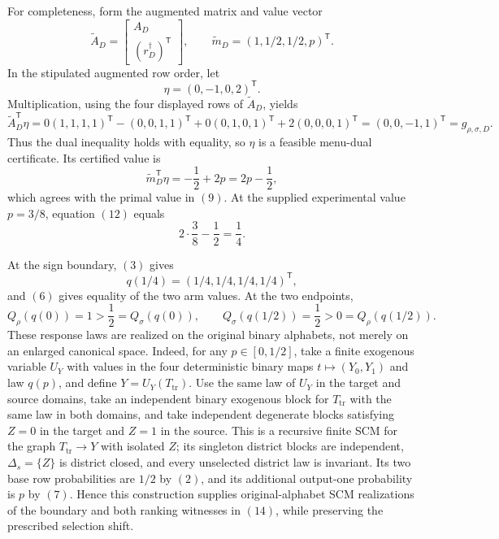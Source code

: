 For completeness, form the augmented matrix and value vector
\[
\widetilde A_D=
\begin{bmatrix}A_D\\(r_D^\dagger)^{\mathsf T}\end{bmatrix},
\qquad
\widetilde m_D=(1,1/2,1/2,p)^{\mathsf T}.
\]
In the stipulated augmented row order, let
\[
\eta=(0,-1,0,2)^{\mathsf T}.
\]
Multiplication, using the four displayed rows of \(\widetilde A_D\), yields
\[
\widetilde A_D^{\mathsf T}\eta
=0(1,1,1,1)^{\mathsf T}
-(0,0,1,1)^{\mathsf T}
+0(0,1,0,1)^{\mathsf T}
+2(0,0,0,1)^{\mathsf T}
=(0,0,-1,1)^{\mathsf T}
=g_{\rho,\sigma,D}.
\tag{11}
\]
Thus the dual inequality holds with equality, so \(\eta\) is a feasible menu-dual certificate.  Its certified value is
\[
\widetilde m_D^{\mathsf T}\eta
=-\frac12+2p
=2p-\frac12,
\tag{12}
\]
which agrees with the primal value in \((9)\).  At the supplied experimental value \(p=3/8\), equation \((12)\) equals
\[
2\cdot\frac38-\frac12=\frac14.
\tag{13}
\]

At the sign boundary, \((3)\) gives
\[
q(1/4)=(1/4,1/4,1/4,1/4)^{\mathsf T},
\]
and \((6)\) gives equality of the two arm values.  At the two endpoints,
\[
Q_\rho(q(0))=1>\frac12=Q_\sigma(q(0)),
\qquad
Q_\sigma(q(1/2))=\frac12>0=Q_\rho(q(1/2)).
\tag{14}
\]
These response laws are realized on the original binary alphabets, not merely on an enlarged canonical space.  Indeed, for any \(p\in[0,1/2]\), take a finite exogenous variable \(U_Y\) with values in the four deterministic binary maps \(t\mapsto(Y_0,Y_1)\) and law \(q(p)\), and define \(Y=U_Y(T_{\mathrm{tr}})\).  Use the same law of \(U_Y\) in the target and source domains, take an independent binary exogenous block for \(T_{\mathrm{tr}}\) with the same law in both domains, and take independent degenerate blocks satisfying \(Z=0\) in the target and \(Z=1\) in the source.  This is a recursive finite SCM for the graph \(T_{\mathrm{tr}}\to Y\) with isolated \(Z\); its singleton district blocks are independent, \(\Delta_s=\{Z\}\) is district closed, and every unselected district law is invariant.  Its two base row probabilities are \(1/2\) by \((2)\), and its additional output-one probability is \(p\) by \((7)\).  Hence this construction supplies original-alphabet SCM realizations of the boundary and both ranking witnesses in \((14)\), while preserving the prescribed selection shift.

